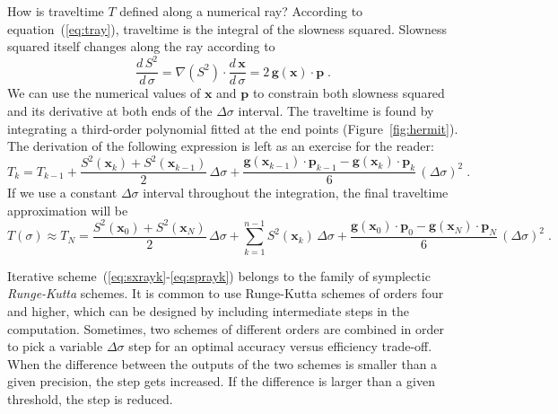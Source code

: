 \documentclass[12pt]{handout}
\begin{document}
How is traveltime $T$ defined along a numerical ray? According to
equation~(\ref{eq:tray}), traveltime is the integral of the slowness
squared. Slowness squared itself changes along the ray according to
\begin{equation}
  \label{eq:dsds}
  \frac{d\,S^2}{d\,\sigma} = 
  \nabla (S^2) \cdot \frac{d\,\mathbf{x}}{d\,\sigma} =
  2\,\mathbf{g}(\mathbf{x}) \cdot \mathbf{p}\;.
\end{equation}
We can use the numerical values of $\mathbf{x}$ and $\mathbf{p}$ to
constrain both slowness squared and its derivative at both ends of the
$\Delta \sigma$ interval. The traveltime is found by integrating a
third-order polynomial fitted at the end points
(Figure~\ref{fig:hermit}). The derivation of the following expression
is left as an exercise for the reader:
\begin{equation}
  \label{eq:tk}
  T_k = T_{k-1} + \frac{S^2(\mathbf{x}_k) +
    S^2(\mathbf{x}_{k-1})}{2}\,
  \Delta \sigma
  + \frac{\mathbf{g}(\mathbf{x}_{k-1}) \cdot \mathbf{p}_{k-1} -
    \mathbf{g}(\mathbf{x}_k) \cdot \mathbf{p}_k}{6}\,(\Delta \sigma)^2\;.
\end{equation}
If we use a constant $\Delta \sigma$ interval throughout the
integration, the final traveltime approximation will be
\begin{equation}
  \label{eq:tsigma}
  T(\sigma) \approx 
  T_N = \frac{S^2(\mathbf{x}_0)+S^2(\mathbf{x}_N)}{2}\,\Delta \sigma
  + \sum_{k=1}^{n-1} S^2(\mathbf{x}_k)\,\Delta \sigma
  + \frac{\mathbf{g}(\mathbf{x}_{0}) \cdot \mathbf{p}_{0} -
    \mathbf{g}(\mathbf{x}_N) \cdot \mathbf{p}_N}{6}\,(\Delta \sigma)^2\;.
\end{equation}


Iterative scheme~(\ref{eq:sxrayk}-\ref{eq:sprayk}) belongs to the
family of symplectic \emph{Runge-Kutta} schemes. It is common to use
Runge-Kutta schemes of orders four and higher, which can be designed
by including intermediate steps in the computation. Sometimes, two
schemes of different orders are combined in order to pick a variable
$\Delta \sigma$ step for an optimal accuracy versus efficiency
trade-off. When the difference between the outputs of the two schemes
is smaller than a given precision, the step gets increased. If the
difference is larger than a given threshold, the step is reduced.
\end{document}
